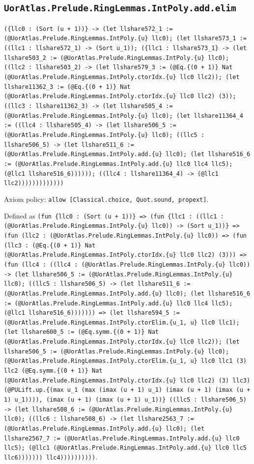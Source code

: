 \documentclass[11pt]{article}
\begin{document}
\subsection*{\texttt{UorAtlas.Prelude.RingLemmas.IntPoly.add.elim}}
\noindent\texttt{(\{llc0 : (Sort (u + 1))\} -> (let llshare572\_1 := (@UorAtlas.Prelude.RingLemmas.IntPoly.\{u\} llc0); (let llshare573\_1 := ((llc1 : llshare572\_1) -> (Sort u\_1)); (\{llc1 : llshare573\_1\} -> (let llshare503\_2 := (@UorAtlas.Prelude.RingLemmas.IntPoly.\{u\} llc0); ((llc2 : llshare503\_2) -> (let llshare579\_3 := (@Eq.\{(0 + 1)\} Nat (@UorAtlas.Prelude.RingLemmas.IntPoly.ctorIdx.\{u\} llc0 llc2)); (let llshare11362\_3 := (@Eq.\{(0 + 1)\} Nat (@UorAtlas.Prelude.RingLemmas.IntPoly.ctorIdx.\{u\} llc0 llc2) (3)); ((llc3 : llshare11362\_3) -> (let llshare505\_4 := (@UorAtlas.Prelude.RingLemmas.IntPoly.\{u\} llc0); (let llshare11364\_4 := ((llc4 : llshare505\_4) -> (let llshare506\_5 := (@UorAtlas.Prelude.RingLemmas.IntPoly.\{u\} llc0); ((llc5 : llshare506\_5) -> (let llshare511\_6 := (@UorAtlas.Prelude.RingLemmas.IntPoly.add.\{u\} llc0); (let llshare516\_6 := (@UorAtlas.Prelude.RingLemmas.IntPoly.add.\{u\} llc0 llc4 llc5); (@llc1 llshare516\_6)))))); ((llc4 : llshare11364\_4) -> (@llc1 llc2)))))))))))))}\par
\noindent Axiom policy: \texttt{allow [Classical.choice, Quot.sound, propext]}.\par
\noindent Defined as \texttt{(fun \{llc0 : (Sort (u + 1))\} => (fun \{llc1 : ((llc1 : (@UorAtlas.Prelude.RingLemmas.IntPoly.\{u\} llc0)) -> (Sort u\_1))\} => (fun (llc2 : (@UorAtlas.Prelude.RingLemmas.IntPoly.\{u\} llc0)) => (fun (llc3 : (@Eq.\{(0 + 1)\} Nat (@UorAtlas.Prelude.RingLemmas.IntPoly.ctorIdx.\{u\} llc0 llc2) (3))) => (fun (llc4 : ((llc4 : (@UorAtlas.Prelude.RingLemmas.IntPoly.\{u\} llc0)) -> (let llshare506\_5 := (@UorAtlas.Prelude.RingLemmas.IntPoly.\{u\} llc0); ((llc5 : llshare506\_5) -> (let llshare511\_6 := (@UorAtlas.Prelude.RingLemmas.IntPoly.add.\{u\} llc0); (let llshare516\_6 := (@UorAtlas.Prelude.RingLemmas.IntPoly.add.\{u\} llc0 llc4 llc5); (@llc1 llshare516\_6))))))) => (let llshare594\_5 := (@UorAtlas.Prelude.RingLemmas.IntPoly.ctorElim.\{u\_1, u\} llc0 llc1); (let llshare600\_5 := (@Eq.symm.\{(0 + 1)\} Nat (@UorAtlas.Prelude.RingLemmas.IntPoly.ctorIdx.\{u\} llc0 llc2)); (let llshare506\_5 := (@UorAtlas.Prelude.RingLemmas.IntPoly.\{u\} llc0); (@UorAtlas.Prelude.RingLemmas.IntPoly.ctorElim.\{u\_1, u\} llc0 llc1 (3) llc2 (@Eq.symm.\{(0 + 1)\} Nat (@UorAtlas.Prelude.RingLemmas.IntPoly.ctorIdx.\{u\} llc0 llc2) (3) llc3) (@PULift.up.\{(max u\_1 (max (imax (u + 1) u\_1) (imax (u + 1) (imax (u + 1) u\_1)))), (imax (u + 1) (imax (u + 1) u\_1))\} ((llc5 : llshare506\_5) -> (let llshare508\_6 := (@UorAtlas.Prelude.RingLemmas.IntPoly.\{u\} llc0); ((llc6 : llshare508\_6) -> (let llshare2563\_7 := (@UorAtlas.Prelude.RingLemmas.IntPoly.add.\{u\} llc0); (let llshare2567\_7 := (@UorAtlas.Prelude.RingLemmas.IntPoly.add.\{u\} llc0 llc5); (@llc1 (@UorAtlas.Prelude.RingLemmas.IntPoly.add.\{u\} llc0 llc5 llc6))))))) llc4))))))))))}.\par
\end{document}
